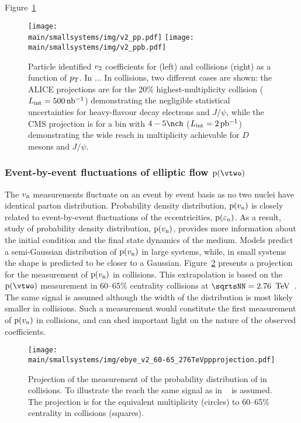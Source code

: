 \documentclass[../report.tex]{subfiles}
\providecommand{\main}{..}
\newcommand{\vn}{\ensuremath{v_{\rm n}\Xspace} }
\begin{document}
Figure~\ref{fig:smallsystems_corr_cumulants_pid}

\begin{figure}[ht]
\centering
\texttt{[image: \\main/smallsystems/img/v2\_pp.pdf]}
\hfill
\texttt{[image: \\main/smallsystems/img/v2\_ppb.pdf]}

\caption{Particle identified $v_{\rm{2}}$ coefficients for \pp (left) and \pPb collisions (right) as a function of $p\sb{\scriptstyle\mathrm{T}}$. In \pp... In \pPb collisions, two different cases are shown: the ALICE projections are for the 20\% highest-multiplicity collision ($L_{\rm int} = \unit[500]{nb^{-1}}$) demonstrating the negligible statistical uncertainties for heavy-flavour decay electrons and $J/\psi$, while the CMS projection is for a bin with $4-5 \nch$ ($L_{\rm int} = \unit[2]{pb^{-1}}$) demonstrating the wide reach in multiplicity achievable for $D$ mesons and $J/\psi$.
}
\label{fig:smallsystems_corr_cumulants_pid}
\end{figure}

\subsubsection{Event-by-event fluctuations of elliptic flow ${\rm p}(\vtwo)$}

The \vn measurements fluctuate on an event by event basis as no two nuclei have identical parton distribution. Probability density distribution, ${\rm p}(\vn)$ is closely related to event-by-event fluctuations of the eccentricities, ${\rm p}(\varepsilon_{\rm{n}})$. As a result, study of probability density distribution, ${\rm p}(\vn)$,  provides more information about the initial condition and the final state dynamics of the medium. Models predict a semi-Gaussian distribution of ${\rm p}(\vn)$ in large systems, while, in small systems the shape is predicted to be closer to a Gaussian. Figure~\ref{fig:smallsystems_corr_pvn} presents a projection for the measurement of ${\rm p}(\vn)$ in \pp collisions. This extrapolation is based on the ${\rm p}(\vtwo)$ measurement in 60--65\% centrality \PbPb collisions at $\sqrtsNN = \unit[2.76]{\UTeV}$~\cite{Aad:2013xma}. The same signal is assumed although the width of the distribution is most likely smaller in \pp collisions. Such a measurement would constitute the first measurement of ${\rm p}(\vn)$ in \pp collisions, and can shed important light on the nature of the observed \vtwo coefficients.


\begin{figure}[ht]
\centering
\texttt{[image: \\main/smallsystems/img/ebye\_v2\_60-65\_276TeVppprojection.pdf]}
\caption{Projection of the measurement of the probability distribution of \vtwo in \pp collisions. To illustrate the reach the same signal as in \PbPb~\cite{Aad:2013xma} is assumed. The projection is for the equivalent \pp multiplicity (circles) to 60--65\% centrality in \PbPb collisions (squares).}
\label{fig:smallsystems_corr_pvn}
\end{figure}
\end{document}
